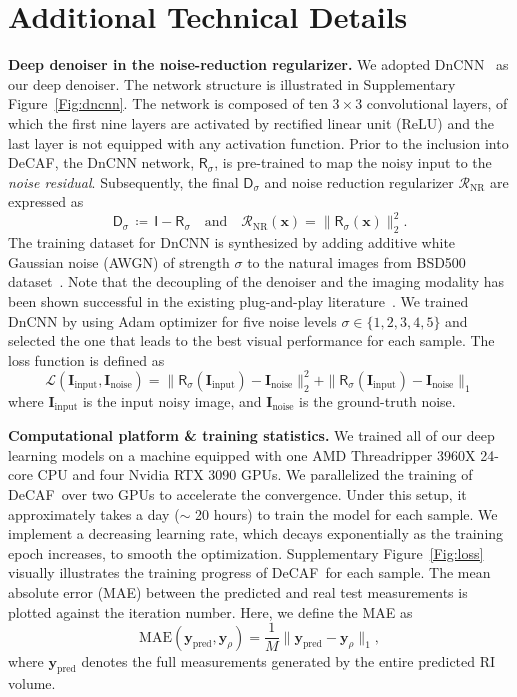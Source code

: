 \documentclass[11pt]{article}
\theoremstyle{plain} %
\def\defn{\,\coloneqq\,}
\def\proposed{DeCAF}
\def\xbm{{\bm{x}}}
\def\ybm{{\bm{y}}}
\def\Ibm{{\bm{I}}}
\def\Dsf{{\mathsf{D}}}
\def\Isf{{\mathsf{I}}}
\def\Rsf{{\mathsf{R}}}
\def\Lcal{{\mathcal{L}}}
\def\Rcal{{\mathcal{R}}}
\begin{document}
\section*{Additional Technical Details} 

\textbf{Deep denoiser in the noise-reduction regularizer.} We adopted DnCNN~\cite{Zhang.etal2017} as our deep denoiser. The network structure is illustrated in Supplementary Figure~\ref{Fig:dncnn}. The network is composed of ten $3\times3$ convolutional layers, of which the first nine layers are activated by rectified linear unit (ReLU) and the last layer is not equipped with any activation function.
Prior to the inclusion into \proposed, the DnCNN network, $\Rsf_\sigma$, is pre-trained to map the noisy input to the \emph{noise residual}. Subsequently, the final $\Dsf_\sigma$ and noise reduction regularizer $\Rcal_\text{NR}$ are expressed as 
\begin{equation}
\Dsf_\sigma \defn \Isf - \Rsf_\sigma\quad\text{and}\quad\Rcal_\text{NR}(\xbm) = \|\Rsf_\sigma(\xbm)\|_2^2.
\end{equation} 
The training dataset for DnCNN is synthesized by adding additive white Gaussian noise (AWGN) of strength $\sigma$ to the natural images from BSD500 dataset~\cite{Martin.etal2001}. Note that the decoupling of the denoiser and the imaging modality has been shown successful in the existing plug-and-play literature~\cite{Sun.etal2020,Xu.etal2020,Zhang.etal2017a}. 
We trained DnCNN by using Adam optimizer for five noise levels $\sigma\in\{1,2,3,4,5\}$ and selected the one that leads to the best visual performance for each sample.
The loss function is defined as
\begin{equation}
\Lcal(\Ibm_\text{input},\Ibm_\text{noise}) = \|\Rsf_\sigma(\Ibm_\text{input})-\Ibm_\text{noise}\|_2^2 + \|\Rsf_\sigma(\Ibm_\text{input})-\Ibm_\text{noise}\|_1
\end{equation}
where $\Ibm_\text{input}$ is the input noisy image, and $\Ibm_\text{noise}$ is the ground-truth noise. 

\vspace{0.5em}
\noindent
\textbf{Computational platform \& training statistics.} We trained all of our deep learning models on a machine equipped with one AMD Threadripper 3960X 24-core CPU and four Nvidia RTX 3090 GPUs. We parallelized the training of \proposed~over two GPUs to accelerate the convergence. 
Under this setup, it approximately takes a day ($\sim$ 20 hours) to train the model for each sample.
We implement a decreasing learning rate, which decays exponentially as the training epoch increases, to smooth the optimization.
Supplementary Figure~\ref{Fig:loss} visually illustrates the training progress of \proposed~for each sample.
The mean absolute error (MAE) between the predicted and real test measurements is plotted against the iteration number. Here, we define the MAE as
\begin{equation}
\text{MAE}(\ybm_\text{pred},\ybm_\rho) = \frac{1}{M}\|\ybm_\text{pred}-\ybm_\rho\|_1,
\end{equation}
where $\ybm_\text{pred}$ denotes the full measurements generated by the entire predicted RI volume.
\end{document}

